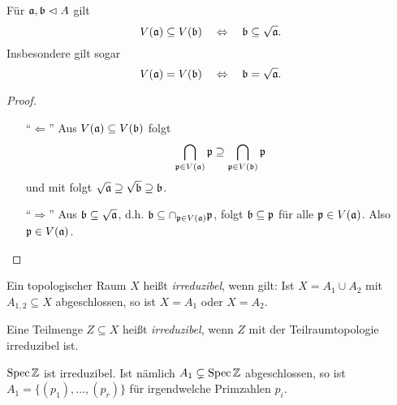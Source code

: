 \begin{satz}
	\label{satz:v und radikal}
	Für $\mathfrak{a}, \mathfrak{b} \vartriangleleft A$ gilt
	\[ V(\mathfrak{a}) \subseteq V(\mathfrak{b}) \quad\Leftrightarrow\quad
		\mathfrak{b} \subseteq \sqrt{\mathfrak{a}}.
	\]
	Insbesondere gilt sogar
	\[ V(\mathfrak{a}) = V(\mathfrak{b}) \quad\Leftrightarrow\quad
		\mathfrak{b} = \sqrt{\mathfrak{a}}.
	\]
\end{satz}
\begin{proof}
	\begin{itemize}
	  \item["`$\Leftarrow$"']
	  	Aus $V(\mathfrak{a}) \subseteq V(\mathfrak{b})$ folgt
	  	\[
	  		\bigcap_{\mathfrak{p} \in V(\mathfrak{a})} \mathfrak{p} 
	  		\supseteq \bigcap_{\mathfrak{p}\in V(\mathfrak{b})} \mathfrak{p}
	  	\]
	  	und mit 
	  	folgt $\sqrt {\mathfrak{a}} \supseteq \sqrt{\mathfrak{b}} \supseteq \mathfrak{b}$.
	  \item["`$\Rightarrow$"']
	  	Aus $\mathfrak{b} \subseteq \sqrt{\mathfrak{a}}$, d.h.
	  	$\mathfrak{b} \subseteq \cap_{\mathfrak{p}\in V(\mathfrak{a})} \mathfrak{p}$, folgt
	  	$\mathfrak{b} \subseteq \mathfrak{p}$ für alle $\mathfrak{p}\in V(\mathfrak{a})$.
	  	Also $\mathfrak{p} \in V(\mathfrak{a})$.
	\end{itemize}
\end{proof}

\begin{definition}[irreduzibel]
	Ein topologischer Raum $X$ heißt \emph{irreduzibel}, wenn gilt:
	Ist $X = A_1 \cup A_2$ mit $A_{1,2}\subseteq X$ abgeschlossen, so ist
	$X = A_1$ oder $X = A_2$.
	
	Eine Teilmenge $Z\subseteq X$ heißt \emph{irreduzibel}, wenn $Z$ mit der
	Teilraumtopologie irreduzibel ist.
\end{definition}

\begin{beispiel}
	$\operatorname{Spec}\mathbb{Z}$ ist irreduzibel. Ist nämlich $A_1 \subsetneq \operatorname{Spec}\mathbb{Z}$ 
	abgeschlossen, so ist $A_1 = \{(p_1), \ldots, (p_r)\}$ für
	irgendwelche Primzahlen $p_i$. 
\end{beispiel}

